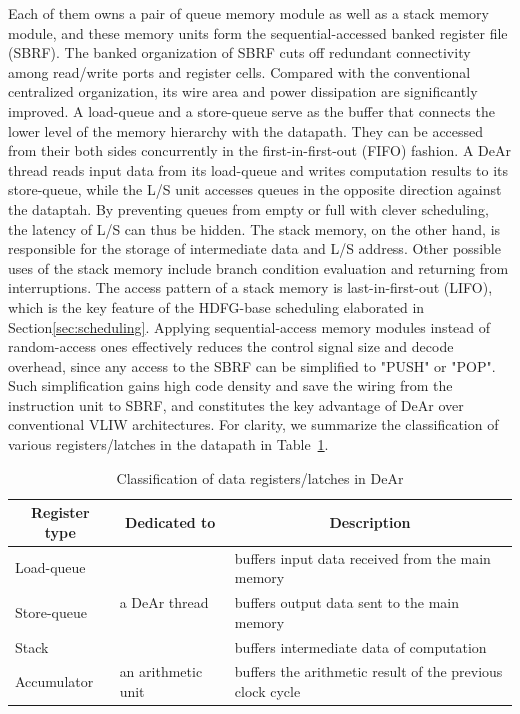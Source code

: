 Each of them owns a pair of queue memory module as well as a stack memory module, 
and these memory units form the sequential-accessed banked register file (SBRF).
The banked organization of SBRF cuts off redundant connectivity among read/write ports and register cells.
Compared with the conventional centralized organization, 
its wire area and power dissipation are significantly improved.
A load-queue and a store-queue serve as the buffer that connects the lower level of the memory hierarchy with the datapath.
They can be accessed from their both sides concurrently in the first-in-first-out (FIFO) fashion.
A DeAr thread reads input data from its load-queue and writes computation results to its store-queue, 
while the L/S unit accesses queues in the opposite direction against the dataptah.
By preventing queues from empty or full with clever scheduling, the latency of L/S can thus be hidden.
The stack memory, on the other hand, is responsible for the storage of intermediate data and L/S address.
Other possible uses of the stack memory include branch condition evaluation and returning from interruptions.
The access pattern of a stack memory is last-in-first-out (LIFO), 
which is the key feature of the HDFG-base scheduling elaborated in Section\ref{sec:scheduling}.
Applying sequential-access memory modules instead of random-access ones effectively reduces the control signal size and decode overhead, 
since any access to the SBRF can be simplified to "PUSH" or "POP".
Such simplification gains high code density and save the wiring from the instruction unit to SBRF, 
and constitutes the key advantage of DeAr over conventional VLIW architectures.
For clarity, we summarize the classification of various registers/latches in the datapath in Table~\ref{tab:register}.
\begin{table}[!ht]
    \caption{Classification of data registers/latches in DeAr}
    \label{tab:register}
    \centering
    \begin{tabular}{|l|l|l|}
        \hline
        \multicolumn{1}{|c|}{\textbf{Register type}} & \multicolumn{1}{c|}{\textbf{Dedicated to}} & \multicolumn{1}{c|}{\textbf{Description}}                 \\ \hline
        Load-queue                                   & \multirow{3}{*}{a DeAr thread}             & buffers input data received from the main memory          \\ \cline{1-1} \cline{3-3} 
        Store-queue                                  &                                            & buffers output data sent to the main memory               \\ \cline{1-1} \cline{3-3} 
        Stack                                        &                                            & buffers intermediate data of computation                  \\ \hline
        Accumulator                                  & an arithmetic unit                         & buffers the arithmetic result of the previous clock cycle \\ \hline
    \end{tabular}
\end{table}
